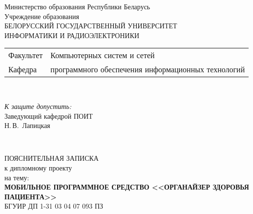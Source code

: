 \begin{titlepage}
  \begin{center}
    Министерство образования Республики Беларусь\\[1em]
    Учреждение образования\\
    БЕЛОРУССКИЙ ГОСУДАРСТВЕННЫЙ УНИВЕРСИТЕТ \\
    ИНФОРМАТИКИ И РАДИОЭЛЕКТРОНИКИ\\[1em]

    \begin{minipage}{\textwidth}
      \begin{flushleft}
        \begin{tabular}{ l l }
          Факультет & Компьютерных систем и сетей\\
          Кафедра   & программного обеспечения информационных технологий
        \end{tabular}
      \end{flushleft}
    \end{minipage}\\[1em]

    \begin{flushright}
      \begin{minipage}{0.4\textwidth}
        \textit{К защите допустить:}\\[0.8em]
        Заведующий кафедрой ПОИТ\\[0.45em]
        \underline{\hspace*{2.8cm}} Н.\,В.~Лапицкая
      \end{minipage}\\[2.2em]
    \end{flushright}

    {ПОЯСНИТЕЛЬНАЯ ЗАПИСКА}\\
    {к дипломному проекту}\\
    {на тему:}\\[1em]
    \textbf{\large МОБИЛЬНОЕ ПРОГРАММНОЕ СРЕДСТВО <<ОРГАНАЙЗЕР ЗДОРОВЬЯ ПАЦИЕНТА>>}\\[1em]


    {БГУИР ДП 1-31 03 04 07 093 ПЗ}\\[2em]
    

\end{center}
\end{titlepage}
